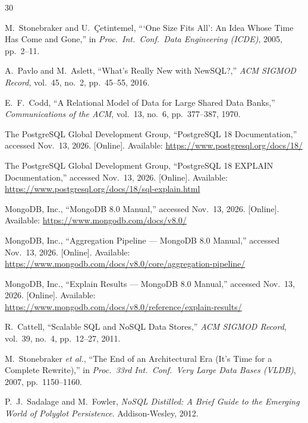 \documentclass[10pt,a4paper,twocolumn]{article}
\begin{document}
\begin{thebibliography}{30}

M.~Stonebraker and U.~\c{C}etintemel, ```One Size Fits All': An Idea Whose Time Has Come
and Gone,'' in \emph{Proc.\ Int.\ Conf.\ Data Engineering (ICDE)}, 2005, pp.~2--11.

A.~Pavlo and M.~Aslett, ``What's Really New with NewSQL?,'' \emph{ACM SIGMOD Record},
vol.~45, no.~2, pp.~45--55, 2016.

E.~F.~Codd, ``A Relational Model of Data for Large Shared Data Banks,''
\emph{Communications of the ACM}, vol.~13, no.~6, pp.~377--387, 1970.

The PostgreSQL Global Development Group, ``PostgreSQL 18 Documentation,'' accessed Nov.\ 13, 2026. [Online].
Available: \url{https://www.postgresql.org/docs/18/}

The PostgreSQL Global Development Group, ``PostgreSQL 18 EXPLAIN Documentation,'' accessed Nov.\ 13, 2026.
[Online]. Available: \url{https://www.postgresql.org/docs/18/sql-explain.html}

MongoDB, Inc., ``MongoDB 8.0 Manual,'' accessed Nov.\ 13, 2026. [Online]. Available:
\url{https://www.mongodb.com/docs/v8.0/}

MongoDB, Inc., ``Aggregation Pipeline --- MongoDB 8.0 Manual,'' accessed Nov.\ 13, 2026. [Online]. Available:
\url{https://www.mongodb.com/docs/v8.0/core/aggregation-pipeline/}

MongoDB, Inc., ``Explain Results --- MongoDB 8.0 Manual,'' accessed Nov.\ 13, 2026. [Online]. Available:
\url{https://www.mongodb.com/docs/v8.0/reference/explain-results/}

R.~Cattell, ``Scalable SQL and NoSQL Data Stores,'' \emph{ACM SIGMOD Record}, vol.~39,
no.~4, pp.~12--27, 2011.

M.~Stonebraker \emph{et al.}, ``The End of an Architectural Era (It's Time for a Complete
Rewrite),'' in \emph{Proc.\ 33rd Int.\ Conf.\ Very Large Data Bases (VLDB)}, 2007, pp.~1150--1160.

P.~J.~Sadalage and M.~Fowler, \emph{NoSQL Distilled: A Brief Guide to the Emerging World
of Polyglot Persistence}. Addison-Wesley, 2012.


\end{thebibliography}
\end{document}

